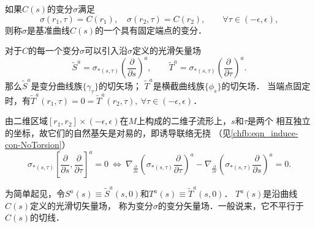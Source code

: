 如果$C(s)$的变分$\sigma$满足
\begin{equation*}
    \sigma(r_1,\tau)=C(r_1), \quad   \sigma(r_2,\tau)=C(r_2), \qquad \forall \tau \in (-\epsilon, \epsilon),
\end{equation*}
则称$\sigma$是基准曲线$C(s)$的一个{\heiti 具有固定端点的变分}．

对于$C$的每一个变分$\sigma$可以引入沿$\sigma$定义的光滑矢量场
\begin{equation}
    \tilde{S}^a = \sigma_{*(s,\tau)}\left(\frac{\partial}{\partial s}\right)^a, \qquad
    \tilde{T}^a = \sigma_{*(s,\tau)}\left(\frac{\partial}{\partial \tau}\right)^a.
\end{equation}
那么$\tilde{S}^a$是变分曲线族$\{\gamma_\tau\}$的切矢场；
$\tilde{T}^a$是横截曲线族$\{\phi_s\}$的切矢场．
当端点固定时，有$\tilde{T}^a(r_1,\tau)=0=\tilde{T}^a(r_2,\tau),\ \forall \tau \in (-\epsilon,\epsilon)$．

由二维区域$[r_1,r_2]\times (-\epsilon, \epsilon)$在$M$上构成的二维子流形上，$s$和$\tau$是两个
相互独立的坐标，故它们的自然基矢是对易的，即诱导联络无挠
（见\eqref{chfb:eqn_induce-con-NoTorsion}）
\begin{equation}\label{chgd:eqn_stts}
    \sigma_{*(s,\tau)}\left[\frac{\partial}{\partial s}, \frac{\partial}{\partial \tau}\right]^a = 0
     {\  \Leftrightarrow \ }
     \nabla_{\frac{\partial}{\partial s}}
       \left(\sigma_{*(s,\tau)}\frac{\partial}{\partial \tau}\right)^a -
     \nabla_{\frac{\partial}{\partial \tau}}
       \left(\sigma_{*(s,\tau)}\frac{\partial}{\partial s}\right)^a = 0 .
\end{equation}


为简单起见，令$S^a(s)\equiv \tilde{S}^a(s,0)$和$T^a(s)\equiv \tilde{T}^a(s,0)$．
$T^a(s)$是沿曲线$C(s)$定义的光滑切矢量场，
称为变分$\sigma$的{\heiti 变分矢量场}．一般说来，它不平行于$C(s)$的切线．


